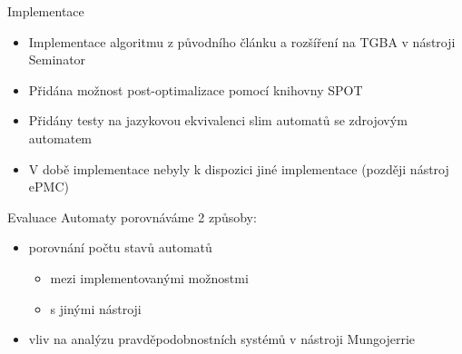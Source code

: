 \documentclass[
]{beamer}
\begin{document}
	\begin{frame}{Implementace}
		\begin{itemize}
			\pause
			\item Implementace algoritmu z původního článku a rozšíření na TGBA v nástroji Seminator
			\pause
			\item Přidána možnost post-optimalizace pomocí knihovny SPOT
			\pause
				
			\pause
			\item Přidány testy na jazykovou ekvivalenci slim automatů se zdrojovým automatem
			\pause
			\item V době implementace nebyly k dispozici jiné implementace (později nástroj ePMC)
			
		\end{itemize}
	\end{frame}

	\begin{frame}{Evaluace}
		\pause
		Automaty porovnáváme 2 způsoby:
		\pause
		\begin{itemize}
			\item porovnání počtu stavů automatů
			\begin{itemize}
				\item mezi implementovanými možnostmi
				\item s jinými nástroji
			\end{itemize}
			\pause
			\item vliv na analýzu pravděpodobnostních systémů v nástroji Mungojerrie
		\end{itemize}
	\end{frame}

	
\end{document}
